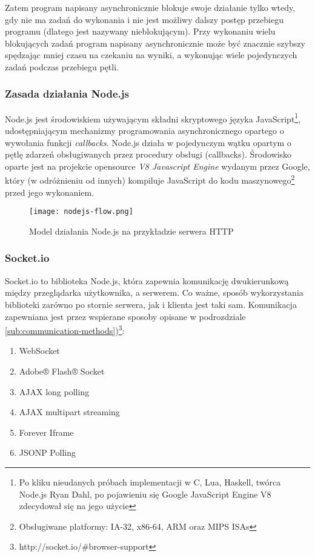 Zatem program napisany asynchronicznie blokuje swoje działanie tylko wtedy, gdy nie ma zadań do wykonania i nie jest możliwy dalszy postęp przebiegu programu (dlatego jest nazywany nieblokującym). Przy wykonaniu wielu blokujących zadań program napisany asynchronicznie może być znacznie szybszy spędzając mniej czasu na czekaniu na wyniki, a wykonując wiele pojedynczych zadań podczas przebiegu pętli.

\subsubsection{Zasada działania Node.js}
\label{sub:tool-server-nodejs}

Node.js jest środowiskiem używającym składni skryptowego języka JavaScript\footnote{Po kliku nieudanych próbach implementacji w C, Lua,  Haskell, twórca Node.js Ryan Dahl, po pojawieniu się Google JavaScript Engine V8 zdecydował się na jego użycie}, udostępniającym mechanizmy programowania asynchronicznego opartego o wywołania funkcji \emph{callbacks}. Node.js działa w pojedynczym wątku opartym o pętlę zdarzeń obsługiwanych przez procedury obsługi (callbacks). Środowisko oparte jest na projekcie opensource \emph{V8 Javascript Engine} wydanym przez Google, który (w odróżnieniu od innych) kompiluje JavaScript do kodu maszynowego\footnote{Obsługiwane platformy: IA-32, x86-64, ARM oraz MIPS ISAs} przed jego wykonaniem.

\begin{figure}[H]
  \caption[Model działania Node.js]{Model działania Node.js na przykładzie serwera HTTP}
  \centering
    \texttt{[image: nodejs-flow.png]}
\end{figure}

\subsubsection{Socket.io}
\label{subsub:socketio}

Socket.io to biblioteka Node.js, która zapewnia komunikację dwukierunkową między przeglądarka użytkownika, a serwerem. Co ważne, sposób wykorzystania biblioteki zarówno po stornie serwera, jak i klienta jest taki sam. Komunikacja zapewniana jest przez wspierane sposoby opisane w podrozdziale \ref{sub:communication-methods})\footnote{http://socket.io/\#browser-support}:

\begin{enumerate}
  \item WebSocket
  \item Adobe® Flash® Socket
  \item AJAX long polling
  \item AJAX multipart streaming
  \item Forever Iframe
  \item JSONP Polling
\end{enumerate}

